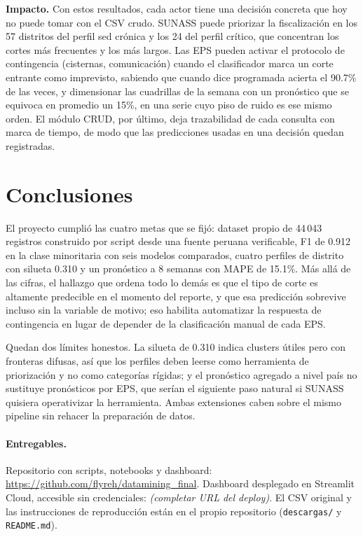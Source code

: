 \documentclass[11pt,a4paper]{article}
\begin{document}
\textbf{Impacto.} Con estos resultados, cada actor tiene una decisión concreta
que hoy no puede tomar con el CSV crudo. SUNASS puede priorizar la fiscalización
en los 57 distritos del perfil \guillemotleft sed crónica\guillemotright{} y los
24 del perfil crítico, que concentran los cortes más frecuentes y los más largos.
Las EPS pueden activar el protocolo de contingencia (cisternas, comunicación)
cuando el clasificador marca un corte entrante como imprevisto, sabiendo que
cuando dice \guillemotleft programada\guillemotright{} acierta el 90.7\% de las
veces, y dimensionar las cuadrillas de la semana con un pronóstico que se
equivoca en promedio un 15\%, en una serie cuyo piso de ruido es ese mismo
orden. El módulo CRUD, por último, deja trazabilidad de cada consulta con marca
de tiempo, de modo que las predicciones usadas en una decisión quedan
registradas.

\section{Conclusiones}

El proyecto cumplió las cuatro metas que se fijó: dataset propio de 44\,043
registros construido por script desde una fuente peruana verificable, F1 de
0.912 en la clase minoritaria con seis modelos comparados, cuatro perfiles de
distrito con silueta 0.310 y un pronóstico a 8 semanas con MAPE de 15.1\%.
Más allá de las cifras, el hallazgo que ordena todo lo demás es que el tipo de
corte es altamente predecible en el momento del reporte, y que esa predicción
sobrevive incluso sin la variable de motivo; eso habilita automatizar la
respuesta de contingencia en lugar de depender de la clasificación manual de
cada EPS.

Quedan dos límites honestos. La silueta de 0.310 indica clusters útiles pero con
fronteras difusas, así que los perfiles deben leerse como herramienta de
priorización y no como categorías rígidas; y el pronóstico agregado a nivel país
no sustituye pronósticos por EPS, que serían el siguiente paso natural si SUNASS
quisiera operativizar la herramienta. Ambas extensiones caben sobre el mismo
pipeline sin rehacer la preparación de datos.

\paragraph{Entregables.} Repositorio con scripts, notebooks y dashboard:
\url{https://github.com/flyreh/datamining_final}. Dashboard desplegado en
Streamlit Cloud, accesible sin credenciales: \textit{(completar URL del deploy)}.
El CSV original y las instrucciones de reproducción están en el propio
repositorio (\texttt{descargas/} y \texttt{README.md}).
\end{document}
